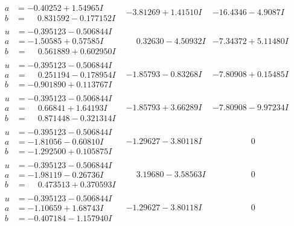 \documentclass[1p]{elsarticle_modified}
\theoremstyle{definition}
\begin{document}
$$\begin{array}{c|c|c}
\begin{aligned}
a &= -0.40252 + 1.54965 I \\
b &= \phantom{-}0.831592 - 0.177152 I\end{aligned}
 & -3.81269 + 1.41510 I & -16.4346 - 4.9087 I \\ \hline\begin{aligned}
u &= -0.395123 - 0.506844 I \\
a &= -1.50585 + 0.57585 I \\
b &= \phantom{-}0.561889 + 0.602950 I\end{aligned}
 & \phantom{-}0.32630 - 4.50932 I & -7.34372 + 5.11480 I \\ \hline\begin{aligned}
u &= -0.395123 - 0.506844 I \\
a &= \phantom{-}0.251194 - 0.178954 I \\
b &= -0.901890 + 0.113767 I\end{aligned}
 & -1.85793 - 0.83268 I & -7.80908 + 0.15485 I \\ \hline\begin{aligned}
u &= -0.395123 - 0.506844 I \\
a &= \phantom{-}0.66841 + 1.64193 I \\
b &= \phantom{-}0.871448 - 0.321314 I\end{aligned}
 & -1.85793 + 3.66289 I & -7.80908 - 9.97234 I \\ \hline\begin{aligned}
u &= -0.395123 - 0.506844 I \\
a &= -1.81056 - 0.60810 I \\
b &= -1.292500 + 0.105875 I\end{aligned}
 & -1.29627 - 3.80118 I & \phantom{-0.000000 } 0 \\ \hline\begin{aligned}
u &= -0.395123 - 0.506844 I \\
a &= -1.98119 - 0.26736 I \\
b &= \phantom{-}0.473513 + 0.370593 I\end{aligned}
 & \phantom{-}3.19680 - 3.58563 I & \phantom{-0.000000 } 0 \\ \hline\begin{aligned}
u &= -0.395123 - 0.506844 I \\
a &= -1.10659 + 1.68743 I \\
b &= -0.407184 - 1.157940 I\end{aligned}
 & -1.29627 - 3.80118 I & \phantom{-0.000000 } 0 \\ \hline\begin{aligned}

\end{aligned}
\end{array}$$
\end{document}
